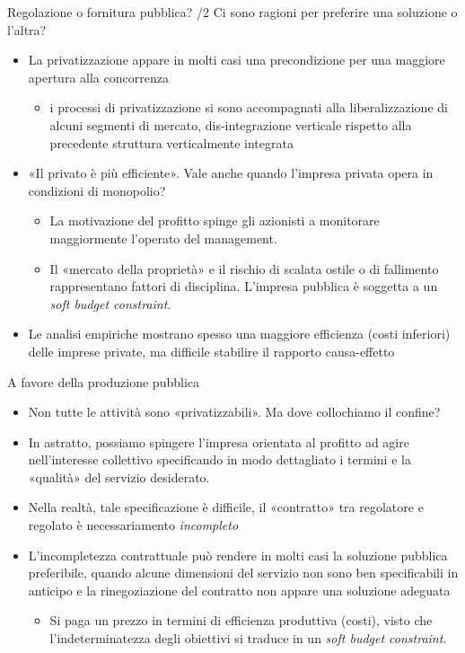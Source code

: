\documentclass[aspectratio=64,12pt]{beamer}
\begin{document}
\begin{frame}{Regolazione o fornitura pubblica? /2}
Ci sono ragioni per preferire una soluzione o l'altra?
\begin{itemize}
\item La privatizzazione appare in molti casi una precondizione per una maggiore
apertura alla concorrenza
\begin{itemize}
\item i processi di privatizzazione si sono accompagnati alla liberalizzazione
di alcuni segmenti di mercato, dis-integrazione verticale rispetto alla
precedente struttura verticalmente integrata
\end{itemize}
\item «Il privato è più efficiente». Vale anche quando l'impresa privata opera in
condizioni di monopolio?
\begin{itemize}
\item La motivazione del profitto spinge gli azionisti a monitorare maggiormente
l'operato del management.
\item Il «mercato della proprietà» e il rischio di scalata ostile o di
fallimento rappresentano fattori di disciplina. L'impresa pubblica è
soggetta a un \emph{soft budget constraint}.
\end{itemize}
\item Le analisi empiriche mostrano spesso una maggiore efficienza (costi
inferiori) delle imprese private, ma difficile stabilire il rapporto
causa-effetto
\end{itemize}
\end{frame}

\begin{frame}{A favore della produzione pubblica}
\begin{itemize}
\item Non tutte le attività sono «privatizzabili». Ma dove collochiamo il confine?
\item In astratto, possiamo spingere l'impresa orientata al profitto ad agire
nell'interesse collettivo specificando in modo dettagliato i termini e la
«qualità» del servizio desiderato.
\item Nella realtà, tale specificazione è difficile, il «contratto» tra regolatore
e regolato è necessariamento \emph{incompleto}
\item L'\alert{incompletezza contrattuale} può rendere in molti casi la soluzione
pubblica preferibile, quando alcune dimensioni del servizio non sono ben
specificabili in anticipo e la rinegoziazione del contratto non appare una
soluzione adeguata
\begin{itemize}
\item Si paga un prezzo in termini di efficienza produttiva (costi), visto che
l'indeterminatezza degli obiettivi si traduce in un \emph{soft budget
constraint}.
\end{itemize}
\end{itemize}
\end{frame}
\end{document}
